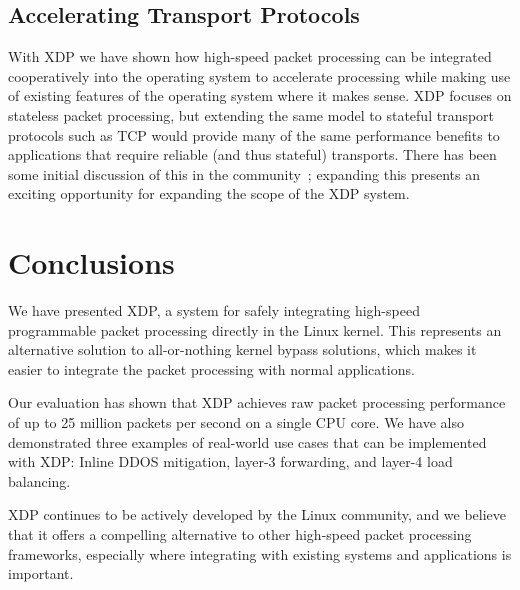 \documentclass[10pt,sigconf]{acmart}
\begin{document}
\subsection{Accelerating Transport Protocols}
\label{sec:accel-transp-prot}

With XDP we have shown how high-speed packet processing can be integrated
cooperatively into the operating system to accelerate processing while making
use of existing features of the operating system where it makes sense. XDP
focuses on stateless packet processing, but extending the same model to stateful
transport protocols such as TCP would provide many of the same performance
benefits to applications that require reliable (and thus stateful) transports.
There has been some initial discussion of this in the community~\cite{txdp};
expanding this presents an exciting opportunity for expanding the scope of the
XDP system.

\section{Conclusions}
\label{sec:conclusion}
We have presented XDP, a system for safely integrating high-speed programmable
packet processing directly in the Linux kernel. This represents an alternative
solution to all-or-nothing kernel bypass solutions, which makes it easier to
integrate the packet processing with normal applications.

Our evaluation has shown that XDP achieves raw packet processing performance of
up to 25 million packets per second on a single CPU core. We have also
demonstrated three examples of real-world use cases that can be implemented with
XDP: Inline DDOS mitigation, layer-3 forwarding, and layer-4 load balancing.

XDP continues to be actively developed by the Linux community, and we believe
that it offers a compelling alternative to other high-speed packet processing
frameworks, especially where integrating with existing systems and applications
is important.



\end{document}
